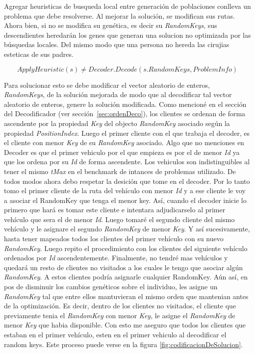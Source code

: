 Agregar heuristicas de busqueda local entre generación de poblaciones conlleva un problema que debe resolverse. Al mejorar la solución, se modifican sus rutas. Ahora bien, si no se modifica su genética, es decir su \textit{RandomKeys}, sus descendientes heredarán los genes que generan una solucion no optimizada por las búsquedas locales. Del mismo modo que una persona no hereda las cirujias esteticas de sus padres. 

\begin{equation*}
ApplyHeuristic(s) \neq Decoder.Decode(s.RandomKeys, ProblemInfo)
\end{equation*}

Para solucionar esto se debe modificar el vector aleatorio de enteros, \textit{RandomKeys}, de la solución mejorada de modo que al decodificar tal vector aleatorio de enteros, genere la solución modificada. Como mencioné en el sección del Decodificador (ver sección~\ref{sec:ordenDeco}), los clientes se ordenan de forma ascendente por la propiedad \textit{Key} del objecto \textit{RandomKey} asociado según la propiedad \textit{PositionIndex}. Luego el primer cliente con el que trabaja el decoder, es el cliente con menor \textit{Key} de su \textit{RandomKey} asociado. Algo que no menciones en Decoder es que el primer vehiculo por el que empieza es por el de menor \textit{Id} ya que los ordena por su \textit{Id} de forma ascendente. Los vehiculos son indistinguibles al tener el mismo \textit{tMax} en el benchmark de intances de problemas utilizado. De todos modos ahora debo respetar la desición que tome en el decoder. Por lo tanto tomo el primer cliente de la ruta del vehículo con menor \textit{Id} y a ese cliente le voy a asociar el {RandomKey} que tenga el menor key. Así, cuando el decoder inicie lo primero que hará es tomar este cliente e intentara adjudicarselo al primer vehículo que sera el de menor \textit{Id}. Luego tomaré el segundo cliente del mismo vehículo y le asignare el segundo \textit{RandomKey} de menor \textit{Key}. Y así sucesivamente, hasta tener mapeados todos los clientes del primer vehículo con su nuevo \textit{RandomKey}. Luego repito el procedimiento con los clientes del siguiente vehículo ordenados por \textit{Id} ascendentemente. Finalmente, no tendré mas vehículos y quedará un resto de clientes no visitados a los cuales le tengo que asociar algún \textit{RandomKey}. A estos clientes podría asignarle cualquier RandomKey. Aún así, en pos de disminuir los cambios genéticos sobre el individuo, les asigne un \textit{RandomKey} tal que entre ellos mantuvieran el mismo orden que mantenian antes de la optimización. Es decir, dentro de los clientes no visitados, el cliente que previamente tenia el \textit{RandomKey} con menor \textit{Key}, le asigne el \textit{RandomKey} de menor \textit{Key} que habia disponible. Con esto me aseguro que todos los clientes que estaban en el primer vehículo, esten en el primer vehiculo al decodificar el random keys. Este proceso puede verse en la figura \ref{fig:codificacionDeSolucion}.

